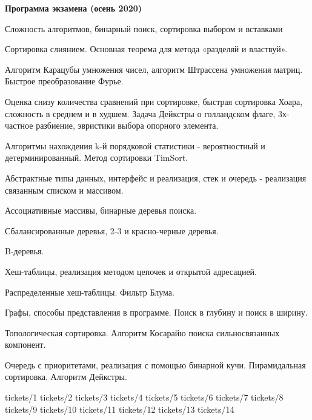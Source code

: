 \documentclass[specialist, subf, href, colorlinks=true, 12pt, times, mtpro, final]{disser}
\begin{document}
\tableofcontents

\newpage
{\Large \bf Программа экзамена (осень 2020)}

\begin{enumerate}
{\footnotesize
\item Сложность алгоритмов, бинарный поиск, сортировка выбором и вставками
\item Сортировка слиянием. Основная теорема для метода «разделяй и властвуй».
\item Алгоритм Карацубы умножения чисел, алгоритм Штрассена умножения матриц. Быстрое преобразование Фурье.
\item Оценка снизу количества сравнений при сортировке, быстрая сортировка Хоара, сложность в среднем и в худшем. Задача Дейкстры о голландском флаге, 3х-частное разбиение, эвристики выбора опорного элемента.
\item Алгоритмы нахождения k-й порядковой статистики - вероятностный и детерминированный. Метод сортировки TimSort.
\item Абстрактные типы данных, интерфейс и реализация, стек и очередь - реализация связанным списком и массивом.
\item Ассоциативные массивы, бинарные деревья поиска.
\item Сбалансированные деревья, 2-3 и красно-черные деревья.
\item B-деревья.
\item Хеш-таблицы, реализация методом цепочек и открытой адресацией.
\item Распределенные хеш-таблицы. Фильтр Блума.
\item Графы, способы представления в программе. Поиск в глубину и поиск в ширину.
\item Топологическая сортировка. Алгоритм Косарайю поиска сильносвязанных компонент.
\item Очередь с приоритетами, реализация с помощью бинарной кучи. Пирамидальная сортировка. Алгоритм Дейкстры.
}
\end{enumerate}

 {tickets/1}
 {tickets/2}
 {tickets/3}
 {tickets/4}
 {tickets/5}
 {tickets/6}
 {tickets/7}
 {tickets/8}
 {tickets/9}
 {tickets/10}
 {tickets/11}
 {tickets/12}
 {tickets/13}
 {tickets/14}
 
\end{document}

